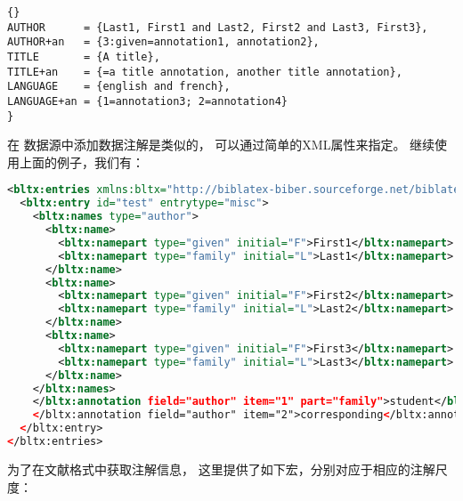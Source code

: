 \begin{lstlisting}[style=bibtex]{}
AUTHOR      = {Last1, First1 and Last2, First2 and Last3, First3},
AUTHOR+an   = {3:given=annotation1, annotation2},
TITLE       = {A title},
TITLE+an    = {=a title annotation, another title annotation},
LANGUAGE    = {english and french},
LANGUAGE+an = {1=annotation3; 2=annotation4}
}
\end{lstlisting}
%


在 \biblatexml 数据源中添加数据注解是类似的，
可以通过简单的XML属性来指定。
继续使用上面的例子，我们有：

\begin{lstlisting}[language=xml]
<bltx:entries xmlns:bltx="http://biblatex-biber.sourceforge.net/biblatexml">
  <bltx:entry id="test" entrytype="misc">
    <bltx:names type="author">
      <bltx:name>
        <bltx:namepart type="given" initial="F">First1</bltx:namepart>
        <bltx:namepart type="family" initial="L">Last1</bltx:namepart>
      </bltx:name>
      <bltx:name>
        <bltx:namepart type="given" initial="F">First2</bltx:namepart>
        <bltx:namepart type="family" initial="L">Last2</bltx:namepart>
      </bltx:name>
      <bltx:name>
        <bltx:namepart type="given" initial="F">First3</bltx:namepart>
        <bltx:namepart type="family" initial="L">Last3</bltx:namepart>
      </bltx:name>
    </bltx:names>
    </bltx:annotation field="author" item="1" part="family">student</bltx:annotation>
    </bltx:annotation field="author" item="2">corresponding</bltx:annotation>
  </bltx:entry>
</bltx:entries>
\end{lstlisting}
%

为了在文献格式中获取注解信息，
这里提供了如下宏，分别对应于相应的注解尺度：

